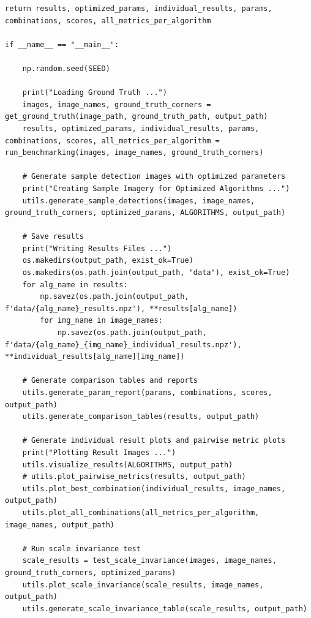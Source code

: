 \documentclass[journal]{IEEEtran}
\begin{document}
\begin{lstlisting}[style=python, caption={Driver Script for Project}, label={lst:driver}]
    return results, optimized_params, individual_results, params, combinations, scores, all_metrics_per_algorithm

if __name__ == "__main__":

    np.random.seed(SEED)
    
    print("Loading Ground Truth ...")
    images, image_names, ground_truth_corners = get_ground_truth(image_path, ground_truth_path, output_path)
    results, optimized_params, individual_results, params, combinations, scores, all_metrics_per_algorithm = run_benchmarking(images, image_names, ground_truth_corners)

    # Generate sample detection images with optimized parameters
    print("Creating Sample Imagery for Optimized Algorithms ...")
    utils.generate_sample_detections(images, image_names, ground_truth_corners, optimized_params, ALGORITHMS, output_path)
    
    # Save results
    print("Writing Results Files ...")
    os.makedirs(output_path, exist_ok=True)
    os.makedirs(os.path.join(output_path, "data"), exist_ok=True)
    for alg_name in results:
        np.savez(os.path.join(output_path, f'data/{alg_name}_results.npz'), **results[alg_name])
        for img_name in image_names:
            np.savez(os.path.join(output_path, f'data/{alg_name}_{img_name}_individual_results.npz'), **individual_results[alg_name][img_name])
    
    # Generate comparison tables and reports
    utils.generate_param_report(params, combinations, scores, output_path)
    utils.generate_comparison_tables(results, output_path)
    
    # Generate individual result plots and pairwise metric plots
    print("Plotting Result Images ...")
    utils.visualize_results(ALGORITHMS, output_path)
    # utils.plot_pairwise_metrics(results, output_path)
    utils.plot_best_combination(individual_results, image_names, output_path)
    utils.plot_all_combinations(all_metrics_per_algorithm, image_names, output_path)
    
    # Run scale invariance test
    scale_results = test_scale_invariance(images, image_names, ground_truth_corners, optimized_params)
    utils.plot_scale_invariance(scale_results, image_names, output_path)
    utils.generate_scale_invariance_table(scale_results, output_path)
\end{lstlisting}
\bigskip
\bigskip
\end{document}
